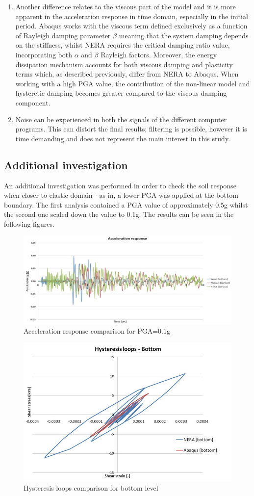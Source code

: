 \documentclass[10pt,a4paper]{report}
\begin{document}
\begin{enumerate}
\item Another difference relates to the viscous part of the model and it is more apparent in the acceleration response in time domain, especially in the initial period. Abaqus works with the viscous term defined exclusively as a function of Rayleigh damping parameter $\beta$ meaning that the system damping depends on the stiffness, whilst NERA requires the critical damping ratio value, incorporating both $\alpha$ and $\beta$ Rayleigh factors. Moreover, the energy dissipation mechanism accounts for both viscous damping and plasticity terms which, as described previously, differ from NERA to Abaqus. When working with a high PGA value, the contribution of the non-linear model and hysteretic damping becomes greater compared to the viscous damping component.
\item Noise can be experienced in both the signals of the different computer programs. This can distort the final results; filtering is possible, however it is time demanding and does not represent the main interest in this study.
\end{enumerate}

\subsection{Additional investigation}
An additional investigation was performed in order to check the soil response when closer to elastic domain - as in, a lower PGA was applied at the bottom boundary. The first analysis contained a PGA value of approximately 0.5g whilst the second one scaled down the value to 0.1g. The results can be seen in the following figures.

\begin{figure}[h!]
	\centering
	\includegraphics[width=0.7\linewidth]{"acc_low"}
	\caption{Acceleration response comparison for PGA=0.1g}
	\label{acc_low}
\end{figure}

\begin{figure}[h!]
	\centering
	\includegraphics[width=0.7\linewidth]{"hysteresis_low_bot"}
	\caption{Hysteresis loops comparison for bottom level}
	\label{hyst_bot}
\end{figure}
\end{document}

